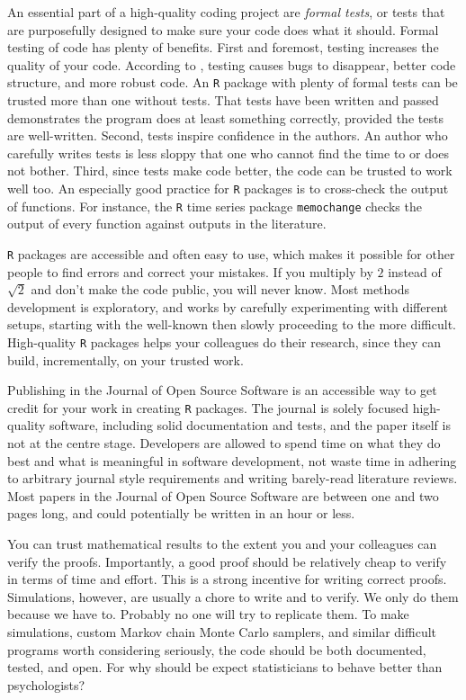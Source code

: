 An essential part of a high-quality coding project are \emph{formal tests}, or tests that are purposefully designed to make sure your code does what it should. Formal testing of code has plenty of benefits. First and foremost, testing increases the quality of your code. According to \textcite[Chapter 7]{Wickham2015-ik}, testing causes bugs to disappear, better code structure, and more robust code. An \texttt{R} package with plenty of formal tests can be trusted more than one without tests. That tests have been written and passed demonstrates the program does at least something correctly, provided the tests are well-written. Second, tests inspire confidence in the authors. An author who carefully writes tests is less sloppy that one who cannot find the time to or does not bother. Third, since tests make code better, the code can be trusted to work well too. An especially good practice for \texttt{R} packages is to cross-check the output of functions. For instance, the \texttt{R} time series package \texttt{memochange} \parencite{memochange} checks the output of every function against outputs in the literature.

\texttt{R} packages are accessible and often easy to use, which makes it possible for other people to find errors and correct your mistakes. If you multiply by $2$ instead of $\sqrt{2}$ and don't make the code public, you will never know. Most methods development is exploratory, and works by carefully experimenting with different setups, starting with the well-known then slowly proceeding to the more difficult. High-quality \texttt{R} packages helps your colleagues do their research, since they can build, incrementally, on your trusted work.  

Publishing in the Journal of Open Source Software is an accessible way to get credit for your work in creating \texttt{R} packages. The journal is solely focused high-quality software, including solid documentation and tests, and the paper itself is not at the centre stage. Developers are allowed to spend time on what they do best and what is meaningful in software development, not waste time in adhering to arbitrary journal style requirements and writing barely-read literature reviews. Most papers in the Journal of Open Source Software are between one and two pages long, and could potentially be written in an hour or less. 

You can trust mathematical results to the extent you and your colleagues can verify the proofs. Importantly, a good proof should be relatively cheap to verify in terms of time and effort. This is a strong incentive for writing correct proofs. Simulations, however, are usually a chore to write and to verify. We only do them because we have to. Probably no one will try to replicate them. To make simulations, custom Markov chain Monte Carlo samplers, and similar difficult programs worth considering seriously, the code should be both documented, tested, and open. For why should be expect statisticians to behave better than psychologists?

